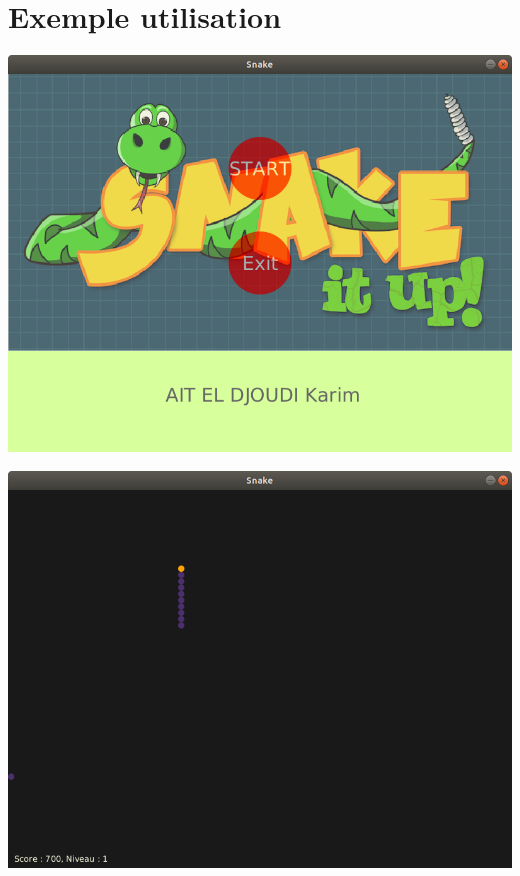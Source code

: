 \documentclass[a4paper]{report}
\begin{document}
\section{Exemple utilisation}
\begin{onehalfspace} 
\begin{description}
\begin{center}
     \includegraphics[width=13.5cm]{ex.png}
\end{center}
\end{description}
\end{onehalfspace}
\begin{onehalfspace} 
\begin{description}
\begin{center}
     \includegraphics[width=13.5cm]{exp1.png}
\end{center}
\end{description}
\end{onehalfspace} 
\end{document}

